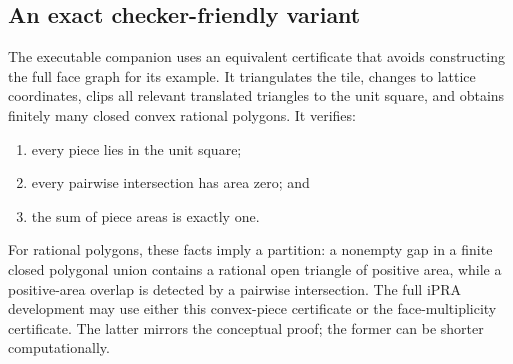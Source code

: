 \subsection{An exact checker-friendly variant}

The executable companion uses an equivalent certificate that avoids constructing the full face graph for its example.  It triangulates the tile, changes to lattice coordinates, clips all relevant translated triangles to the unit square, and obtains finitely many closed convex rational polygons.  It verifies:
\begin{enumerate}[label=(\arabic*)]
\item every piece lies in the unit square;
\item every pairwise intersection has area zero; and
\item the sum of piece areas is exactly one.
\end{enumerate}
For rational polygons, these facts imply a partition: a nonempty gap in a finite closed polygonal union contains a rational open triangle of positive area, while a positive-area overlap is detected by a pairwise intersection.  The full iPRA development may use either this convex-piece certificate or the face-multiplicity certificate.  The latter mirrors the conceptual proof; the former can be shorter computationally.
